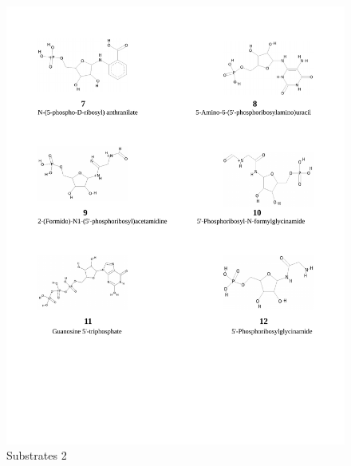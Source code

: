 \documentclass[12pt,twoside]{reedthesis}
\begin{document}
  \begin{figure}[h!tbp]
   \centering
   \includegraphics[angle = 0,scale = 1]{chapter4/esquema_quimico-2-2.pdf}
   \caption[Substrates 2]{\normalsize{Substrates 2}}
   \label{fig:Substrates chemical 2}
   \end{figure}
  
\end{document}
